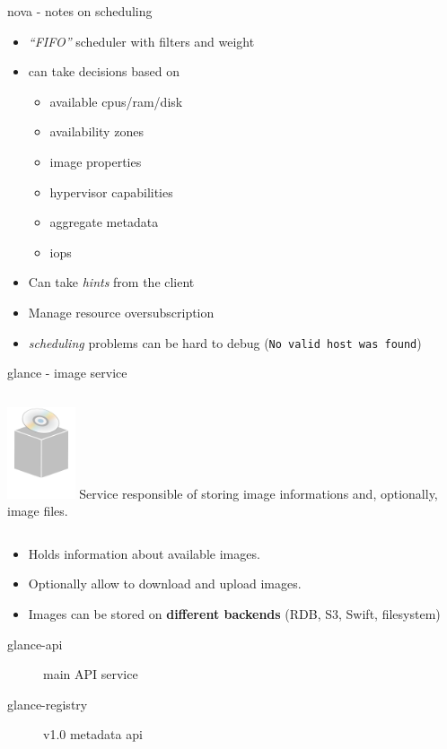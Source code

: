 \documentclass[english,serif,mathserif,usenames,dvipsnames]{beamer}
\begin{document}
\begin{frame}
  {nova - notes on scheduling}

  \begin{itemize}
  \item \textit{``FIFO''} scheduler with filters and weight
  \item can take decisions based on
    \begin{itemize}
    \item available cpus/ram/disk
    \item availability zones
    \item image properties
    \item hypervisor capabilities
    \item aggregate metadata
    \item iops
    \end{itemize}
  \item Can take \textit{hints} from the client
  \item Manage resource oversubscription
  \item \textit{scheduling} problems can be hard to debug (\texttt{No valid host was
      found})
  \end{itemize}
\end{frame}

\begin{frame}
  {glance - image service}
  \begin{columns}
    \column{2cm}
    \includegraphics[width=2cm]{glance-icon.png}
    \column{8cm}
    Service responsible of storing image informations and, optionally,
    image files.
  \end{columns}

  \+
  \begin{itemize}
  \item Holds information about available images.
  \item Optionally allow to download and upload images.
  \item Images can be stored on \textbf{different backends} (RDB, S3,
    Swift, filesystem)
  \end{itemize}
  \begin{description}
  \item[glance-api] main API service
  \item[glance-registry] v1.0 metadata api
  \end{description}
\end{frame}
\end{document}
